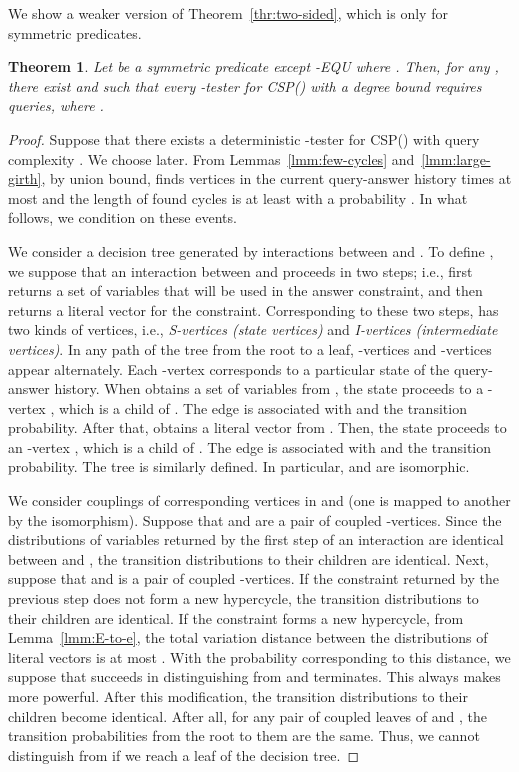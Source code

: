 \documentclass[letterpaper,11pt]{article}
\newtheorem{theorem}{Theorem}[section]
\newcommand{\csp}[1]{\textsf{CSP}(#1)\xspace}
\newcommand{\kequ}{-\textsf{EQU}\xspace}
\begin{document}
We show a weaker version of Theorem~\ref{thr:two-sided}, which is only for symmetric predicates.
\begin{theorem}\label{thr:two-sided-weak}
  Let  be a symmetric predicate except \kequ where .
  Then, for any ,
  there exist  and  such that 
  every -tester for \csp{} with a degree bound  requires  queries,
  where .
\end{theorem}
\begin{proof}
  Suppose that there exists a deterministic -tester  for \csp{} with query complexity .
  We choose  later.
  From Lemmas~\ref{lmm:few-cycles} and~\ref{lmm:large-girth},
  by union bound,
   finds vertices in the current query-answer history  times at most and the length of found cycles is at least  with a probability .
  In what follows, we condition on these events.

  We consider a decision tree  generated by interactions between  and .
  To define , 
  we suppose that an interaction between  and  proceeds in two steps;
  i.e.,  first returns a set of  variables  that will be used in the answer constraint,
  and then returns a literal vector  for the constraint.
  Corresponding to these two steps,
   has two kinds of vertices, i.e., \textit{S-vertices (state vertices)} and \textit{I-vertices (intermediate vertices)}.
  In any path of the tree from the root to a leaf,
  -vertices and -vertices appear alternately.
  Each -vertex  corresponds to a particular state of the query-answer history.
  When  obtains a set of variables  from ,
  the state proceeds to a -vertex ,
  which is a child of .
  The edge  is associated with  and the transition probability.
  After that,  obtains a literal vector  from .
  Then, the state proceeds to an -vertex ,
  which is a child of .
  The edge  is associated with  and the transition probability.
  The tree  is similarly defined.
  In particular,
   and  are isomorphic.
    
  We consider couplings of corresponding vertices in  and  (one is mapped to another by the isomorphism).
  Suppose that  and  are a pair of coupled -vertices.
  Since the distributions of variables returned by the first step of an interaction are identical between  and ,
  the transition distributions to their children are identical.
  Next, suppose that  and  is a pair of coupled -vertices.
  If the constraint returned by the previous step does not form a new hypercycle,
  the transition distributions to their children are identical.
  If the constraint forms a new hypercycle,
  from Lemma~\ref{lmm:E-to-e},
  the total variation distance between the distributions of literal vectors is at most .
  With the probability corresponding to this distance,
  we suppose that  succeeds in distinguishing  from  and terminates.
  This always makes  more powerful.
  After this modification, 
  the transition distributions to their children become identical.
  After all, for any pair of coupled leaves of  and , 
  the transition probabilities from the root to them are the same.
  Thus, we cannot distinguish  from  if we reach a leaf of the decision tree.


\end{proof}
\end{document}
